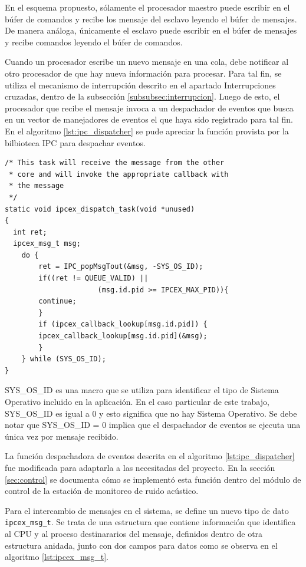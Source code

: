En el esquema propuesto, sólamente el procesador maestro puede escribir en el búfer de comandos y recibe los mensaje del esclavo leyendo el búfer de mensajes.  De manera análoga, únicamente el esclavo puede escribir en el búfer de mensajes y recibe comandos leyendo el búfer de comandos.

Cuando un procesador escribe un nuevo mensaje en una cola, debe notificar al otro procesador de que hay nueva información para procesar. Para tal fin, se utiliza el mecanismo de interrupción descrito en el apartado Interrupciones cruzadas, dentro de la subsección \ref{subsubsec:interrupcion}.  Luego de esto, el procesador que recibe el mensaje invoca a un despachador de eventos que busca en un vector de manejadores de eventos el que haya sido registrado para tal fin. En el algoritmo \ref{lst:ipc_dispatcher} se pude apreciar la función provista por la bilbioteca IPC para despachar eventos.

\vspace{10px}

\begin{lstlisting}[caption={Función despachadora de eventos de la biblioteca IPC.},label={lst:ipc_dispatcher}]
/* This task will receive the message from the other 
 * core and will invoke the appropriate callback with
 * the message
 */
static void ipcex_dispatch_task(void *unused)
{
  int ret;
  ipcex_msg_t msg;
  	do {
    	ret = IPC_popMsgTout(&msg, -SYS_OS_ID);
    	if((ret != QUEUE_VALID) || 
                      (msg.id.pid >= IPCEX_MAX_PID)){
      	continue;
    	}
    	if (ipcex_callback_lookup[msg.id.pid]) {
      	ipcex_callback_lookup[msg.id.pid](&msg);
    	}
  	} while (SYS_OS_ID);
}
\end{lstlisting}
\vspace{5px}
SYS\_OS\_ID es una macro que se utiliza para identificar el tipo de Sistema Operativo incluido en la aplicación.  En el caso particular de este trabajo, SYS\_OS\_ID es igual a 0 y esto significa que no hay Sistema Operativo.  Se debe notar que SYS\_OS\_ID = 0 implica que el despachador de eventos se ejecuta una única vez por mensaje recibido.

La función despachadora de eventos descrita en el algoritmo \ref{lst:ipc_dispatcher} fue modificada para adaptarla a las necesitadas del proyecto.  En la sección \ref{sec:control} se documenta cómo se implementó esta función dentro del módulo de control de la estación de monitoreo de ruido acústico.

Para el intercambio de mensajes en el sistema, se define un nuevo tipo de dato \texttt{ipcex\_msg\_t}.  Se trata de una estructura que contiene información que identifica al CPU y al proceso destinararios del mensaje, definidos dentro de otra estructura anidada, junto con dos campos para datos como se observa en el algoritmo \ref{lst:ipcex_msg_t}. 

